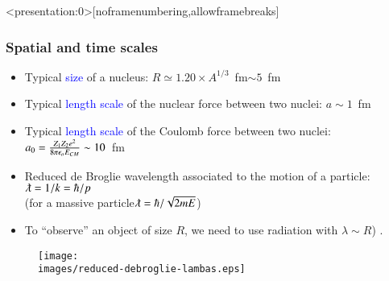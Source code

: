 \documentclass[english,10pt]{beamer}
\newcommand{\images}{images}
\begin{document}
\begin{frame}<presentation:0>[noframenumbering,allowframebreaks]
\frametitle{Spatial and time scales}

\begin{itemize}
\item Typical \textcolor{blue}{size} of a nucleus: $R \simeq 1.20 \times A^{1/3}$~fm$ \sim 5$~fm 
\item Typical \textcolor{blue}{length scale} of the nuclear force between two nuclei:  $a \sim 1$~fm
\item Typical \textcolor{blue}{length scale} of the Coulomb force between two nuclei:  $a_0 = {Z_1 Z_2 e^2 \over 8 \pi \epsilon_o E_{CM}}\sim 10$~fm
\item Reduced de Broglie wavelength associated to the motion of a particle: $\lambdabar = 1/k = {\hbar}/{p}$ \\ 
{\footnotesize (for a massive particle$\lambdabar ={\hbar}/{\sqrt{2 m E}}$)} 	
\item To ``observe'' an object of size $R$, we need to use radiation with $\lambda \sim R$) .
\end{itemize}

\begin{figure}{\par \resizebox*{0.8\textwidth}{!}
{\texttt{[image: \\images/reduced-debroglie-lambas.eps]}} \par}
\end{figure}


\footnotesize

\end{frame}
\end{document}
